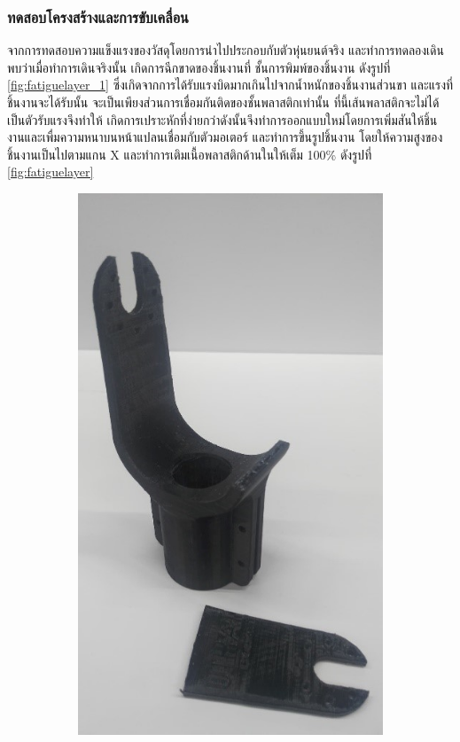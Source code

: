 \subsubsection{ทดสอบโครงสร้างและการขับเคลื่อน}	
จากการทดสอบความแข็งแรงของวัสดุโดยการนำไปประกอบกับตัวหุ่นยนต์จริง และทำการทดลองเดินพบว่าเมื่อทำการเดินจริงนั้น 
เกิดการฉีกขาดของชิ้นงานที่ ชั้นการพิมพ์ของชิ้นงาน ดังรูปที่ \ref{fig:fatiguelayer_1} ซึ่งเกิดจากการได้รับแรงบิดมากเกินไปจากน้ำหนักของชิ้นงานส่วนขา
และแรงที่ชิ้นงานจะได้รับนั้น จะเป็นเพียงส่วนการเชื่อมกันติดของชั้นพลาสติกเท่านั้น ที่นี้เส้นพลาสติกจะไม่ได้เป็นตัวรับแรงจึงทำให้
เกิดการเปราะหักที่ง่ายกว่าดังนั้นจึงทำการออกแบบใหม่โดยการเพิ่มสันให้ชิ้นงานและเพื่มความหนาบนหน้าแปลนเชื่อมกับตัวมอเตอร์
และทำการขึ้นรูปชิ้นงาน โดยให้ความสูงของชิ้นงานเป็นไปตามแกน X และทำการเติมเนื้อพลาสติกด้านในให้เต็ม 100\% ดังรูปที่ \ref{fig:fatiguelayer}
\begin{figure}[!ht]
    \centering
    \begin{subfigure}[b]{0.225\linewidth}
      \includegraphics[width=\linewidth]{chapter4/images/fatigue1.jpg}

\end{subfigure}
\end{figure}

